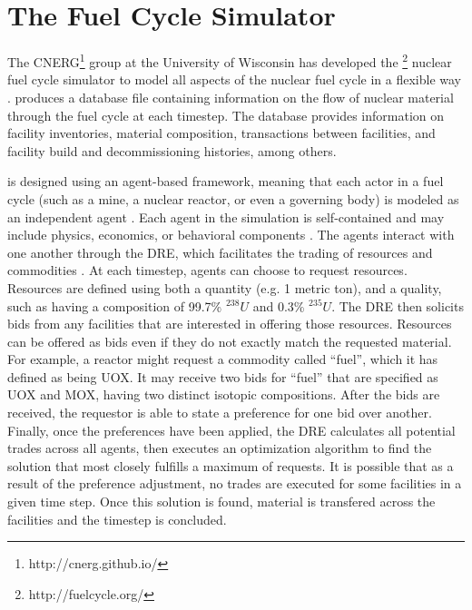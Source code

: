 \section{The \Cyclus Fuel Cycle Simulator}
\label{s_methods}


The \gls{CNERG}\footnote{http://cnerg.github.io/} group at the University of Wisconsin has developed the \Cyclus\footnote{http://fuelcycle.org/} nuclear fuel cycle simulator to model all aspects of the nuclear fuel cycle in a flexible way \cite{cyclus_v1_0,cyclus_v1_2,cyclus_v1_3}. \Cyclus produces a database file containing information on the flow of nuclear material through the fuel cycle at each timestep.  The database provides information on facility inventories, material composition, transactions between facilities, and facility build and decommissioning histories, among others.

\Cyclus is designed using an agent-based framework, meaning that each actor  in a fuel cycle (such as a mine, a nuclear reactor, or even a governing body) is modeled as an independent agent \cite{jennings_agent-based_2000, taylor2014agent}.  Each agent in the simulation is self-contained and may include physics, economics, or behavioral components \cite{huff_open_2011,gidden_agent-based_2013,gidden_agent-based_2015}.  The agents interact with one another through the \gls{DRE}, which facilitates the trading of resources and commodities \cite{gidden_agent-based_2014}.  At each timestep, agents can choose to request resources.  Resources are defined using both a quantity (e.g. 1 metric ton), and a quality, such as having a composition of 99.7\% $^{238}U$ and 0.3\% $^{235}U$.  The \gls{DRE} then solicits bids from any facilities that are interested in offering those resources. Resources can be offered as bids even if they do not exactly match the requested material. For example, a reactor might request a commodity called ``fuel'', which it has defined as being \gls{UOX}.  It may receive two bids for ``fuel'' that are specified as \gls{UOX} and \gls{MOX}, having two distinct isotopic compositions. After the bids are received, the requestor is able to state a preference for one bid over another. Finally, once the preferences have been applied, the \gls{DRE} calculates all potential trades across all agents, then executes an optimization algorithm to find the solution that most closely fulfills a maximum of requests. It is possible that as a result of the preference adjustment, no trades are executed for some facilities in a given time step.  Once this solution is found, material is transfered across the facilities and the timestep is concluded.

